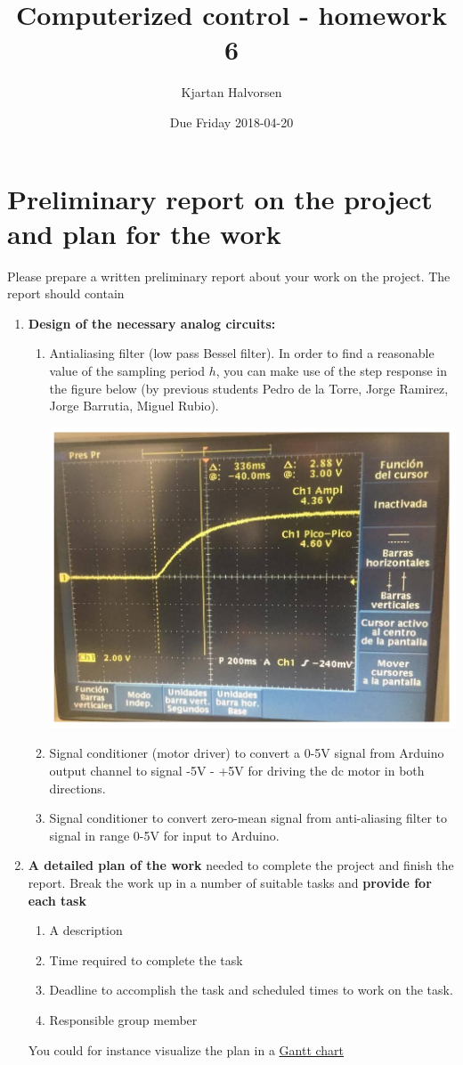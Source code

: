 \documentclass[a4paper]{scrartcl}
\author{Kjartan Halvorsen}
\date{Due Friday 2018-04-20}
\title{Computerized control - homework 6}
\begin{document}
\maketitle

\section*{Preliminary report on the project and plan for the work}
\label{sec-1}

Please prepare a written preliminary report about your work on the project. The report should contain
\begin{enumerate}
\item \textbf{Design of the necessary analog circuits:}
\begin{enumerate}
\item Antialiasing filter (low pass Bessel filter). In order to find a reasonable value of the sampling period \(h\), you can make use of the step response in the figure below (by previous students Pedro de la Torre, Jorge Ramirez, Jorge Barrutia, Miguel Rubio). 
\begin{center}
\includegraphics[width=0.8\linewidth]{../figures/step-response-oscilloscope.png}
\end{center}
\item Signal conditioner (motor driver) to convert a 0-5V signal from Arduino output channel to signal -5V - +5V for driving the dc motor in both directions.
\item Signal conditioner to convert zero-mean signal from anti-aliasing filter to signal in range 0-5V for input to Arduino.
\end{enumerate}
\item \textbf{A detailed plan of the work} needed to complete the project and finish the report. Break the work up in a number of suitable tasks and \textbf{provide for each task}
\begin{enumerate}
\item A description
\item Time required to complete the task
\item Deadline to accomplish the task and scheduled times to work on the task.
\item Responsible group member
\end{enumerate}
You could for instance visualize the plan in a \href{https://es.wikipedia.org/wiki/Diagrama_de_Gantt}{Gantt chart}
\end{enumerate}
\end{document}
